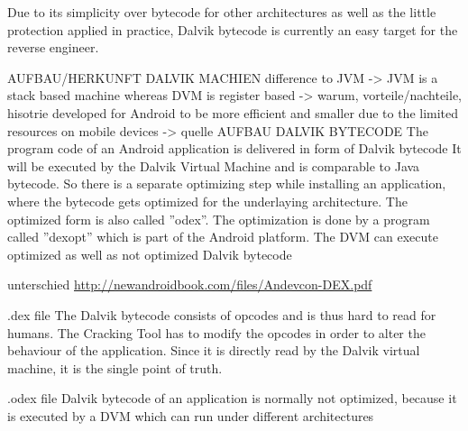 Due to its simplicity over bytecode for other architectures as well as the little protection applied in practice, Dalvik bytecode is currently an easy target for the reverse engineer.
\cite{kovachevaMaster} \cite{ehringerDalvik}
%




AUFBAU/HERKUNFT DALVIK MACHIEN\newline
difference to JVM -> JVM is a stack based machine whereas DVM is register based -> warum, vorteile/nachteile, hisotrie\newline
developed for Android to be more efficient and smaller due to the limited resources on mobile devices -> quelle\newline
AUFBAU DALVIK BYTECODE\newline
The program code of an Android application is delivered in form of Dalvik bytecode\newline
It will be executed by the Dalvik Virtual Machine and is comparable to Java bytecode. So there is a separate
optimizing step while installing an application, where the bytecode gets optimized for the underlaying architecture. The optimized form is also called ”odex”. The optimization is done by a program called ”dexopt” which is part of the Android platform. The DVM can execute optimized as well as not optimized Dalvik bytecode\newline

unterschied \url{http://newandroidbook.com/files/Andevcon-DEX.pdf}\newline

.dex file
The Dalvik bytecode consists of opcodes and is thus hard to read for humans. The Cracking Tool has to modify the opcodes in order to alter the behaviour of the application. Since it is directly read by the Dalvik virtual machine, it is the single point of truth.\newline

.odex file
Dalvik bytecode of an application is normally not optimized, because it is executed by a DVM which can run under different architectures\newline
